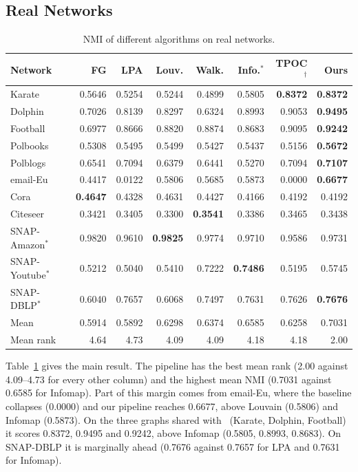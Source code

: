 \documentclass[conference]{IEEEtran}
\begin{document}
\subsection{Real Networks}
\begin{table}[t]
\centering
\caption{NMI of different algorithms on real networks.}
\label{tab:real}
\scriptsize
\begin{tabular}{lrrrrrrr}
\toprule
Network & FG & LPA & Louv. & Walk. & Info.$^{*}$ & TPOC$^{\dagger}$ & Ours \\
\midrule
Karate & 0.5646 & 0.5254 & 0.5244 & 0.4899 & 0.5805 & \textbf{0.8372} & \textbf{0.8372} \\
Dolphin & 0.7026 & 0.8139 & 0.8297 & 0.6324 & 0.8993 & 0.9053 & \textbf{0.9495} \\
Football & 0.6977 & 0.8666 & 0.8820 & 0.8874 & 0.8683 & 0.9095 & \textbf{0.9242} \\
Polbooks & 0.5308 & 0.5495 & 0.5499 & 0.5427 & 0.5437 & 0.5156 & \textbf{0.5672} \\
Polblogs & 0.6541 & 0.7094 & 0.6379 & 0.6441 & 0.5270 & 0.7094 & \textbf{0.7107} \\
email-Eu & 0.4417 & 0.0122 & 0.5806 & 0.5685 & 0.5873 & 0.0000 & \textbf{0.6677} \\
Cora & \textbf{0.4647} & 0.4328 & 0.4631 & 0.4427 & 0.4166 & 0.4192 & 0.4192 \\
Citeseer & 0.3421 & 0.3405 & 0.3300 & \textbf{0.3541} & 0.3386 & 0.3465 & 0.3438 \\
SNAP-Amazon$^{*}$ & 0.9820 & 0.9610 & \textbf{0.9825} & 0.9774 & 0.9710 & 0.9586 & 0.9731 \\
SNAP-Youtube$^{*}$ & 0.5212 & 0.5040 & 0.5410 & 0.7222 & \textbf{0.7486} & 0.5195 & 0.5745 \\
SNAP-DBLP$^{*}$ & 0.6040 & 0.7657 & 0.6068 & 0.7497 & 0.7631 & 0.7626 & \textbf{0.7676} \\
\midrule
Mean & 0.5914 & 0.5892 & 0.6298 & 0.6374 & 0.6585 & 0.6258 & 0.7031 \\
Mean rank & 4.64 & 4.73 & 4.09 & 4.09 & 4.18 & 4.18 & 2.00 \\
\bottomrule
\end{tabular}
\end{table}
Table~\ref{tab:real} gives the main result. The pipeline has the best mean rank (2.00 against 4.09--4.73 for every other column) and the highest mean NMI (0.7031 against 0.6585 for Infomap). Part of this margin comes from email-Eu, where the baseline collapses (0.0000) and our pipeline reaches 0.6677, above Louvain (0.5806) and Infomap (0.5873). On the three graphs shared with~\cite{kong2026} (Karate, Dolphin, Football) it scores 0.8372, 0.9495 and 0.9242, above Infomap (0.5805, 0.8993, 0.8683). On SNAP-DBLP it is marginally ahead (0.7676 against 0.7657 for LPA and 0.7631 for Infomap).
\end{document}
